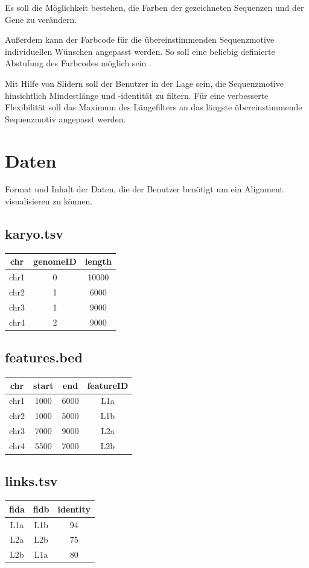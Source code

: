 \documentclass[a4paper]{scrreprt}
\begin{document}
Es soll die Möglichkeit bestehen, die Farben der gezeichneten Sequenzen und der Gene zu verändern.

Außerdem kann der Farbcode für die übereinstimmenden Sequenzmotive individuellen Wünschen angepasst werden. So soll eine beliebig definierte Abstufung des Farbcodes möglich sein .

Mit Hilfe von Slidern soll der Benutzer in der Lage sein, die Sequenzmotive hinsichtlich Mindestlänge und -identität zu filtern. Für eine verbesserte Flexibilität soll das Maximum des Längefilters an das längste übereinstimmende Sequenzmotiv angepasst werden.

\chapter{Daten}
Format und Inhalt der Daten, die der Benutzer benötigt um ein Alignment visualisieren zu können.
\section{karyo.tsv}
\begin{tabular}{|c|c|c|}\hline
   chr & genomeID & length \\ \hline
   chr1 & 0 & 10000 \\ \hline
   chr2 & 1 & 6000 \\ \hline
   chr3 & 1 & 9000 \\ \hline
   chr4 & 2 & 9000 \\ \hline
\end{tabular}
\section{features.bed}
\begin{tabular}{|c|c|c|c|}\hline
   chr & start & end & featureID \\ \hline
   chr1 & 1000 & 6000 & L1a \\ \hline
   chr2 & 1000 & 5000 & L1b \\ \hline
   chr3 & 7000 & 9000 & L2a \\ \hline
   chr4 & 5500 & 7000 & L2b \\ \hline
\end{tabular}
\section{links.tsv}
\begin{tabular}{|c|c|c|}\hline
   fida & fidb & identity \\ \hline
   L1a & L1b & 94 \\ \hline
   L2a & L2b & 75 \\ \hline
   L2b & L1a & 80 \\ \hline
\end{tabular}
\end{document}
